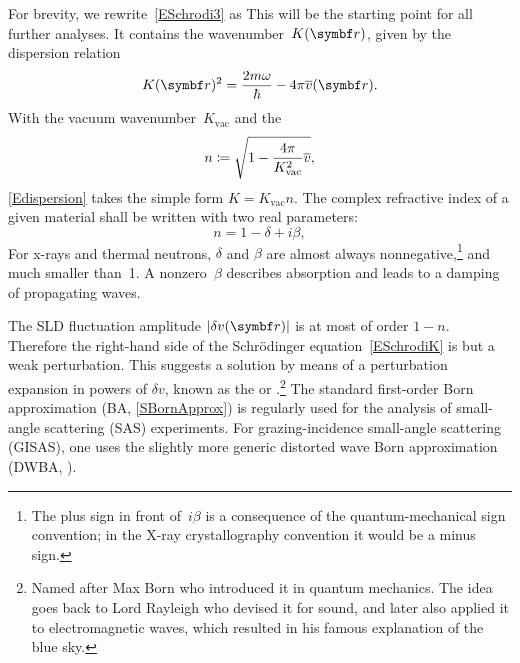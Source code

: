 For brevity, we rewrite~\cref{ESchrodi3} as
This will be the starting point for all further analyses.
It contains the wavenumber~$K(\r)$, given by the dispersion relation
%
%
%
\begin{equation}\label{Edispersion}
  K(\r)^2 = \frac{2m\omega}{\hbar} - 4\pi\mv(\r).
\end{equation}
With the vacuum wavenumber~$K_\text{vac}$
%
and the 
%
%
%
\begin{equation}\label{EnRefrIndx}
  n\coloneqq \sqrt{1-\frac{4\pi}{K_\text{vac}^2}\overline{v}},
\end{equation}
\cref{Edispersion} takes the simple form $K=K_\text{vac} n$.
%
The complex refractive index of a given material
shall be written with two real parameters:
\begin{equation}\label{Endb1}
  n =  1-\delta +i\beta,
\end{equation}
%
%
For x-rays and thermal neutrons,
$\delta$ and $\beta$ are almost always nonnegative,\footnote
{The plus sign in front of~$i\beta$ is a consequence of
the quantum-mechanical sign convention;
in the X-ray crystallography convention it would be a minus sign.
%
}
and much smaller than~1.
A nonzero~$\beta$ describes absorption and leads to a damping of propagating waves.

The SLD fluctuation amplitude $|\delta v(\r)|$ is at most of order $1-n$.
Therefore the right-hand side of the Schrödinger equation~\cref{ESchrodiK}
is but a weak perturbation.
This suggests a solution
by means of a perturbation expansion in powers of $\delta v$,
known as the  or .\footnote{
Named after Max Born
who introduced it in quantum mechanics.
The idea goes back to Lord Rayleigh
who devised it for sound,
and later also applied it to electromagnetic waves,
which resulted in his famous explanation of the blue sky.}
The standard first-order Born approximation (BA, \cref{SBornApprox})
is regularly used  for the analysis of small-angle scattering (SAS) experiments.
%
%
%
%
For grazing-incidence small-angle scattering (GISAS),
one uses the slightly more generic distorted wave Born approximation (DWBA, ).
%

